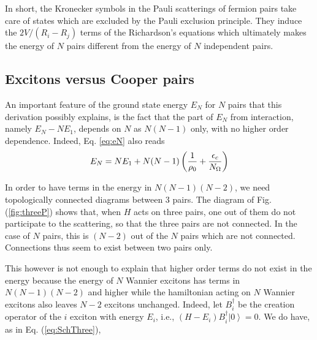 \documentclass[epj]{svjour}
\begin{document}
In short, the Kronecker symbols in the Pauli scatterings of fermion pairs
take care of states which are excluded by the Pauli exclusion principle. They induce the $2V/(R_i-R_j)$ terms
of the Richardson's equations which ultimately makes the energy of $N$ pairs different
from the energy of $N$ independent pairs.

\subsection{Excitons versus Cooper pairs}

An important feature of the ground state energy $E _N$ for $N$ pairs that
this  derivation possibly explains, is the fact that the
part of $E_N$  from interaction, namely $E _N-N%
E _1$, depends on $N$ as $N(N-1)$ only, with no higher order dependence. Indeed, Eq. \eqref{eq:eN}  also reads
\begin{equation}  \label{eq:en}
E _N=NE _1+N(N-1)\left(\frac{1}{\rho_0} +\frac{\epsilon_c}{%
N_\Omega}\right) 
\end{equation}

In order to have terms in the energy in $N(N-1)(N-2)$, we need topologically connected
diagrams between 3 pairs. The diagram of Fig. (\ref{fig:threeP}) shows that, when $H$ acts on three pairs, one out of them do not participate to the scattering, so that the three pairs are not connected. In the case of $N$ pairs, this is $(N-2)$ out of the $N$ pairs which are not connected. Connections thus seem to exist between two pairs only. 

This however is not enough to explain that higher order terms do not exist in the energy because the energy of $N$ Wannier excitons has terms in $N(N-1)(N-2)$ and higher\cite{monicOdil}  while the hamiltonian acting on $N$ Wannier excitons  also leaves $N-2$ excitons unchanged. Indeed, let $B_i^\dagger$ be the creation operator of the $i$ exciton with energy $E_i$, i.e., $(H-E_i)B^\dagger_i\left|0\right>=0$.  We do have, as in Eq. (\ref{eq:SchThree}), 
\end{document}
